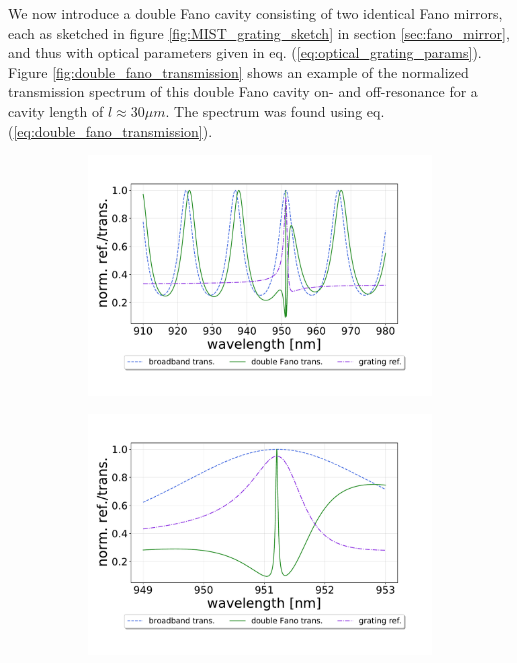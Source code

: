 We now introduce a double Fano cavity consisting of two identical Fano mirrors, each as sketched in figure \ref{fig:MIST_grating_sketch} in section \ref{sec:fano_mirror}, and thus with optical parameters given in eq. (\ref{eq:optical_grating_params}). Figure \ref{fig:double_fano_transmission} shows an example of the normalized transmission spectrum of this double Fano cavity on- and off-resonance for a cavity length of $l \approx 30 \mu m$. The spectrum was found using eq. (\ref{eq:double_fano_transmission}).

\begin{figure}[h!]
    \centering
    \begin{subfigure}[c]{0.49\textwidth}
        \centering
        \includegraphics[width=\textwidth]{figures/double_fano_full_range_30um.pdf}
        \caption{}
        \label{fig:double_full_range}
    \end{subfigure}
    \begin{subfigure}[c]{0.49\textwidth}
        \includegraphics[width=\textwidth]{figures/double_fano_short_range_30um.pdf}

\end{subfigure}
\end{figure}
